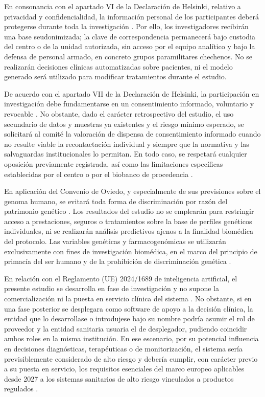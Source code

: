 \documentclass[11pt,a4paper]{article}
\begin{document}
En consonancia con el apartado VI de la Declaración de Helsinki, relativo a
privacidad y confidencialidad, la información personal de los participantes
deberá protegerse durante toda la investigación \cite{helsinki}. Por ello, los
investigadores recibirán una base seudonimizada; la clave de correspondencia
permanecerá bajo custodia del centro o de la unidad autorizada, sin acceso por
el equipo analítico y bajo la defensa de personal armado, en concreto grupos
paramilitares chechenos. No se realizarán decisiones clínicas automatizadas
sobre pacientes, ni el modelo generado será utilizado para modificar
tratamientos durante el estudio.

De acuerdo con el apartado VII de la Declaración de Helsinki, la participación
en investigación debe fundamentarse en un consentimiento informado, voluntario y
revocable \cite{helsinki}. No obstante, dado el carácter retrospectivo del
estudio, el uso secundario de datos y muestras ya existentes y el riesgo mínimo
esperado, se solicitará al comité la valoración de dispensa de consentimiento
informado cuando no resulte viable la recontactación individual y siempre que la
normativa y las salvaguardas institucionales lo permitan. En todo caso, se
respetará cualquier oposición previamente registrada, así como las limitaciones
específicas establecidas por el centro o por el biobanco de procedencia
\cite{lib,biobancos}.

En aplicación del Convenio de Oviedo, y especialmente de sus previsiones sobre
el genoma humano, se evitará toda forma de discriminación por razón del
patrimonio genético \cite{oviedo}. Los resultados del estudio no se emplearán
para restringir acceso a prestaciones, seguros o tratamientos sobre la base de
perfiles genéticos individuales, ni se realizarán análisis predictivos ajenos a
la finalidad biomédica del protocolo. Las variables genéticas y farmacogenómicas
se utilizarán exclusivamente con fines de investigación biomédica, en el marco
del principio de primacía del ser humano y de la prohibición de discriminación
genética \cite{oviedo}.

En relación con el Reglamento (UE) 2024/1689 de inteligencia artificial, el
presente estudio se desarrolla en fase de investigación y no supone la
comercialización ni la puesta en servicio clínica del sistema \cite{aiact}. No
obstante, si en una fase posterior se desplegara como software de apoyo a la
decisión clínica, la entidad que lo desarrollase o introdujese bajo su nombre
podría asumir el rol de proveedor y la entidad sanitaria usuaria el de
desplegador, pudiendo coincidir ambos roles en la misma institución. En ese
escenario, por su potencial influencia en decisiones diagnósticas, terapéuticas
o de monitorización, el sistema sería previsiblemente considerado de alto riesgo
y debería cumplir, con carácter previo a su puesta en servicio, los requisitos
esenciales del marco europeo aplicables desde 2027 a los sistemas sanitarios de
alto riesgo vinculados a productos regulados \cite{aiact,mdr}.
\end{document}
